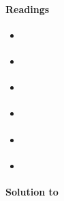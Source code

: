 \paragraph{Readings}
\begin{itemize}
	\item \textcite{Christiano.Trabandt.Walentin_2010_DSGEModelsMonetary}
	\item \textcite[Ch.3]{Gali_2015_MonetaryPolicyInflation}
	\item \textcite[Ch.19]{Heijdra_2017_FoundationsModernMacroeconomics}
	\item \textcite[Ch.7]{Romer_2019_AdvancedMacroeconomics}
	\item \textcite[Ch.8]{Walsh_2017_MonetaryTheoryPolicy}
	\item \textcite[Ch.3]{Woodford_2003_InterestPricesFoundations}
\end{itemize}

\begin{solution}\textbf{Solution to }
\ifDisplaySolutions

\fi
\newpage
\end{solution}